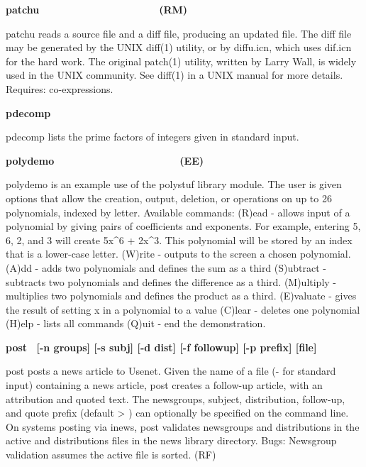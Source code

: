 {{\sffamily\bfseries
patchu\ \ \ \ \ \ \ \ \ \ \ \ \ \ \ \ \ \ \ \  \ (RM)}

\textsf{patch}\textsf{u} reads a source file and a diff
file, producing an updated file. The diff file may be generated by the
UNIX \textsf{diff(1)} utility, or by \textsf{diffu.icn}, which uses
\textsf{dif.icn} for the hard work. The original \textsf{patch(1)}
utility, written by Larry Wall, is widely used in the UNIX community.
See \textsf{diff(1)} in a UNIX manual for more details. Requires:
co-expressions.

{\sffamily\bfseries
pdecomp\ \ \ \ \ \ \ \ \ \ \ \ \ \ \ \ \ \ \ \ }

\textsf{pdecomp} lists the prime factors of integers given in standard
input.

{\sffamily\bfseries
polydemo\ \ \ \ \ \ \ \ \ \ \ \ \ \ \ \ \ \ \ \  \ \ (EE)}

\textsf{polydemo} is an example use of the \textsf{polystuf} library
module. The user is given options that allow the creation, output,
deletion, or operations on up to 26 polynomials, indexed by letter.
Available commands: (R)ead - allows input of a polynomial by giving
pairs of coefficients and exponents. For example, entering 5, 6, 2, and
3 will create 5x\^{}6 + 2x\^{}3. This polynomial will be stored by an
index that is a lower-case letter. (W)rite - outputs to the screen a
chosen polynomial. (A)dd - adds two polynomials and defines the sum as
a third (S)ubtract - subtracts two polynomials and defines the
difference as a third. (M)ultiply - multiplies two polynomials and
defines the product as a third. (E)valuate - gives the result of
setting x in a polynomial to a value (C)lear - deletes one polynomial
(H)elp - lists all commands (Q)uit - end the demonstration.

{\sffamily\bfseries
post \ \textrm{\textmd{[-n groups] [-s subj] [-d dist] [-f followup] [-p
prefix] [file]}}}

\textsf{post} posts a news article to Usenet. Given the name
of a file (\textsf{{\textquotedbl}-{\textquotedbl}} for standard input)
containing a news article, \textsf{post} creates a follow-up article,
with an attribution and quoted text. The newsgroups, subject,
distribution, follow-up, and quote prefix (default
{\textquotesingle}{\textgreater} {\textquotesingle}) can optionally be
specified on the command line. On systems posting via \textsf{inews},
\textsf{post} validates newsgroups and distributions in the
\textsf{active} and \textsf{distributions} files in the news library
directory. Bugs: Newsgroup validation assumes the active file is
sorted. (RF)

}

